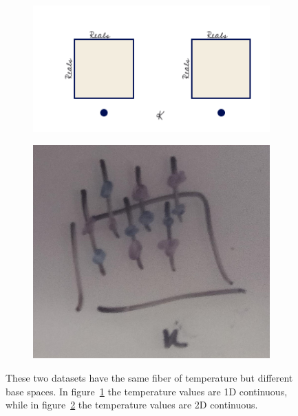 \documentclass[../main.tex]{subfiles}
\begin{document}
\begin{figure}[H]
    \begin{subfigure}{.5\textwidth}
        \includegraphics[width=\textwidth]{figures/math/temp_1k.png}
        \label{fig:base_example_line}
    \end{subfigure}
    \begin{subfigure}{.5\textwidth}
        \includegraphics[width=\textwidth]{figures/math/temp_2k.png}
        \label{fig:base_example_plane}
    \end{subfigure}
    \label{fig:base_example}
    \caption{These two datasets have the same fiber of temperature but different base spaces. In figure~\ref{fig:base_example_line} the temperature values are 1D continuous, while in figure~\ref{fig:base_example_plane} the temperature values are 2D continuous.}
\end{figure}
\end{document}
